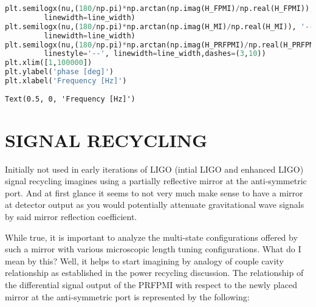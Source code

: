 \begin{lstlisting}[frame=single, language=Python]
plt.semilogx(nu,(180/np.pi)*np.arctan(np.imag(H_FPMI)/np.real(H_FPMI)), '--', 
	     linewidth=line_width)
plt.semilogx(nu,(180/np.pi)*np.arctan(np.imag(H_MI)/np.real(H_MI)), '--', 
	     linewidth=line_width)
plt.semilogx(nu,(180/np.pi)*np.arctan(np.imag(H_PRFPMI)/np.real(H_PRFPMI)),
	     linestyle='--', linewidth=line_width,dashes=(3,10))
plt.xlim([1,100000])
plt.ylabel('phase [deg]')
plt.xlabel('Frequency [Hz]')
\end{lstlisting}

\begin{lstlisting}
Text(0.5, 0, 'Frequency [Hz]')
\end{lstlisting}

\hypertarget{signal-recyclinginitially-not-used-in-early-iterations-of-ligo-intial-ligo-and-enhanced-ligo-signal-recycling-imagines-using-a-partially-reflective-mirror-at-the-anti-symmetric-port.-and-at-first-glance-it-seems-to-not-very-much-make-sense-to-have-a-mirror-at-detector-output-as-you-would-potentially-attenuate-gravitational-wave-signals-by-said-mirror-reflection-coefficient.}{%
\section{SIGNAL RECYCLING}
Initially not used in early iterations of LIGO
(intial LIGO and enhanced LIGO) signal recycling imagines using a
partially reflective mirror at the anti-symmetric port. And at first
glance it seems to not very much make sense to have a mirror at detector
output as you would potentially attenuate gravitational wave signals by
said mirror reflection
coefficient.}\label{signal-recyclinginitially-not-used-in-early-iterations-of-ligo-intial-ligo-and-enhanced-ligo-signal-recycling-imagines-using-a-partially-reflective-mirror-at-the-anti-symmetric-port.-and-at-first-glance-it-seems-to-not-very-much-make-sense-to-have-a-mirror-at-detector-output-as-you-would-potentially-attenuate-gravitational-wave-signals-by-said-mirror-reflection-coefficient.}

While true, it is important to analyze the multi-state configurations
offered by such a mirror with various microscopic length tuning
configurations. What do I mean by this? Well, it helps to start
imagining by analogy of couple cavity relationship as established in the
power recycling discussion. The relationship of the differential signal
output of the PRFPMI with respect to the newly placed mirror at the
anti-symmetric port is represented by the following:

